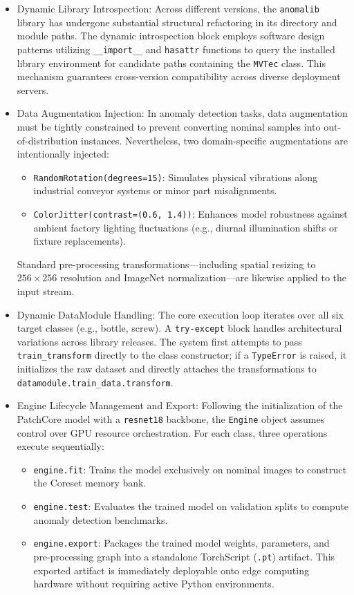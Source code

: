 \documentclass{article}
\begin{document}
\begin{itemize}
	\item Dynamic Library Introspection: Across different versions, the \texttt{anomalib} library has undergone substantial structural refactoring in its directory and module paths. The dynamic introspection block employs software design patterns utilizing \texttt{\_\_import\_\_} and \texttt{hasattr} functions to query the installed library environment for candidate paths containing the \texttt{MVTec} class. This mechanism guarantees cross-version compatibility across diverse deployment servers.
	
	\item Data Augmentation Injection: In anomaly detection tasks, data augmentation must be tightly constrained to prevent converting nominal samples into out-of-distribution instances. Nevertheless, two domain-specific augmentations are intentionally injected:
	\begin{itemize}
		\item \texttt{RandomRotation(degrees=15)}: Simulates physical vibrations along industrial conveyor systems or minor part misalignments.
		\item \texttt{ColorJitter(contrast=(0.6, 1.4))}: Enhances model robustness against ambient factory lighting fluctuations (e.g., diurnal illumination shifts or fixture replacements).
	\end{itemize}
	Standard pre-processing transformations—including spatial resizing to $256 \times 256$ resolution and ImageNet normalization—are likewise applied to the input stream.
	
	\item Dynamic DataModule Handling: The core execution loop iterates over all six target classes (e.g., bottle, screw). A \texttt{try-except} block handles architectural variations across library releases. The system first attempts to pass \texttt{train\_transform} directly to the class constructor; if a \texttt{TypeError} is raised, it initializes the raw dataset and directly attaches the transformations to \texttt{datamodule.train\_data.transform}.
	
	\item Engine Lifecycle Management and Export: Following the initialization of the PatchCore model with a \texttt{resnet18} backbone, the \texttt{Engine} object assumes control over GPU resource orchestration. For each class, three operations execute sequentially:
	\begin{itemize}
		\item \texttt{engine.fit}: Trains the model exclusively on nominal images to construct the Coreset memory bank.
		\item \texttt{engine.test}: Evaluates the trained model on validation splits to compute anomaly detection benchmarks.
		\item \texttt{engine.export}: Packages the trained model weights, parameters, and pre-processing graph into a standalone TorchScript (\texttt{.pt}) artifact. This exported artifact is immediately deployable onto edge computing hardware without requiring active Python environments.
	\end{itemize}
\end{itemize}
\end{document}
